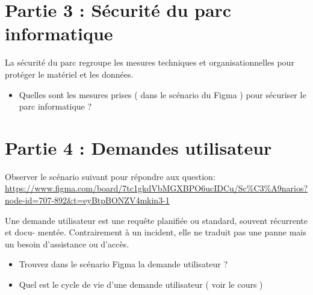 \documentclass[12pt, letterpaper]{article}
\begin{document}
\section*{Partie 3 : Sécurité du parc informatique}


\begin{tcolorbox}[colback=brown!5,colframe=brown!60!black,title=Définition]
La sécurité du parc regroupe les mesures techniques et organisationnelles pour protéger le
matériel et les données.
\end{tcolorbox}

\begin{itemize}
    \item Quelles sont les mesures prises ( dans le scénario du Figma ) pour sécuriser le parc informatique ?
\end{itemize}


\section*{Partie 4 : Demandes utilisateur}

\begin{tcolorbox}[colback=green!5,colframe=green!60!black,title=Figme d'étude (difficile)]
Observer le scénario suivant pour répondre aux question: 
\url{https://www.figma.com/board/7tc1gkdVbMGXBPO6ucIDCu/Sc%C3%A9narios?node-id=707-892&t=eyBtpBONZV4mkin3-1}
\end{tcolorbox}


\begin{tcolorbox}[colback=brown!5,colframe=brown!60!black,title=Définition]
Une demande utilisateur est une requête planifiée ou standard, souvent récurrente et docu-
mentée. Contrairement à un incident, elle ne traduit pas une panne mais un besoin d’assistance
ou d’accès.
\end{tcolorbox}

\begin{itemize}
    \item Trouvez dans le scénario Figma la demande utilisateur ?  
    \item Quel est le cycle de vie d’une demande utilisateur ( voir le cours )
\end{itemize}
\end{document}
